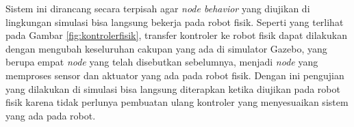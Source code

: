 Sistem ini dirancang secara terpisah agar \emph{node behavior} yang diujikan di lingkungan simulasi bisa langsung bekerja pada robot fisik.
Seperti yang terlihat pada Gambar \ref{fig:kontrolerfisik}, transfer kontroler ke robot fisik dapat dilakukan dengan mengubah keseluruhan cakupan yang ada di simulator Gazebo, yang berupa empat \emph{node} yang telah disebutkan sebelumnya, menjadi \emph{node} yang memproses sensor dan aktuator yang ada pada robot fisik.
Dengan ini pengujian yang dilakukan di simulasi bisa langsung diterapkan ketika diujikan pada robot fisik karena tidak perlunya pembuatan ulang kontroler yang menyesuaikan sistem yang ada pada robot.
